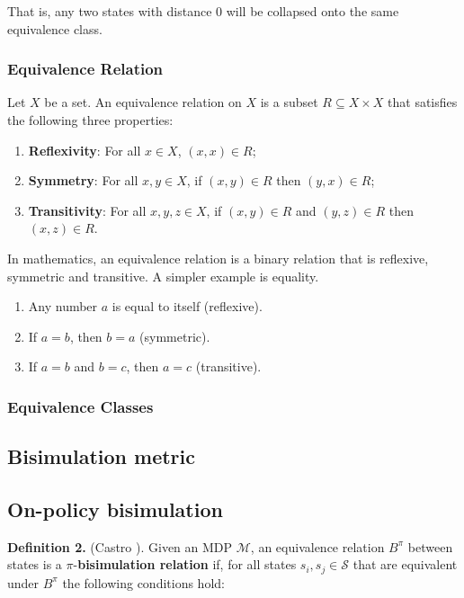 That is, any two states with distance 0 will be collapsed onto the same equivalence class.

\subsubsection{Equivalence Relation}

\begin{definition}
Let $X$ be a set. An equivalence relation on $X$ is a subset $R \subseteq X \times X$ that satisfies the following three properties:
\begin{enumerate}
    \item \textbf{Reflexivity}: For all $x \in X$, $(x,x) \in R$;
    \item \textbf{Symmetry}: For all $x, y \in X$, if $(x,y) \in R$ then $(y,x) \in R$;
    \item \textbf{Transitivity}: For all $x, y, z \in X$, if $(x,y) \in R$ and $(y,z) \in R$ then $(x,z) \in R$.
\end{enumerate}
\end{definition}

In mathematics, an equivalence relation is a binary relation that is reflexive, symmetric and transitive. A simpler example is equality. 

\begin{enumerate}
    \item Any number $a$ is equal to itself (reflexive).
    \item  If $a=b$, then $b=a$ (symmetric).
    \item If $a=b$ and $b=c$, then $a=c$ (transitive). 
\end{enumerate}

\subsubsection{Equivalence Classes}


\subsection{Bisimulation metric}

\subsection{On-policy bisimulation}

\textbf{Definition 2.} (Castro \cite{castro2020scalable}). Given an MDP $\mathcal{M}$, an equivalence relation $B^\pi$ between states is a $\pi$-\textbf{bisimulation relation} if, for all states $s_i, s_j \in \mathcal{S}$ that are equivalent under $B^\pi$ the following conditions hold:


